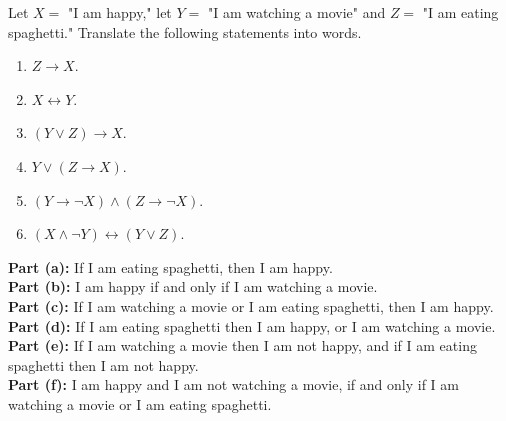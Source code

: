 \documentclass[11pt]{article}
\begin{document}
\begin{homeworkProblem}

Let $X = $ "I am happy," let $Y = $ "I am watching a movie" and $Z = $ "I am eating spaghetti." 
Translate the following statements into words.

\begin{enumerate}[label=(\alph*), topsep=5pt, itemsep=2pt]
    \item $Z \rightarrow X$.
    \item $X \leftrightarrow Y$.
    \item $(Y \lor Z) \rightarrow X$.
    \item $Y \lor (Z \rightarrow X)$.
    \item $(Y \rightarrow \lnot X) \land (Z \rightarrow \lnot X)$.
    \item $(X \land \lnot Y) \leftrightarrow (Y \lor Z)$.
\end{enumerate} \vspace{1\baselineskip}

\solution

\textbf{Part (a):} If I am eating spaghetti, then I am happy. \\

\textbf{Part (b):} I am happy if and only if I am watching a movie. \\

\textbf{Part (c):} If I am watching a movie or I am eating spaghetti, then I am happy. \\
 
\textbf{Part (d):} If I am eating spaghetti then I am happy, or I am watching a movie. \\

\textbf{Part (e):} If I am watching a movie then I am not happy, and if I am eating spaghetti then I am not happy. \\

\textbf{Part (f):} I am happy and I am not watching a movie, if and only if I am watching a movie or I am eating spaghetti. 

\end{homeworkProblem}

\pagebreak
\end{document}
